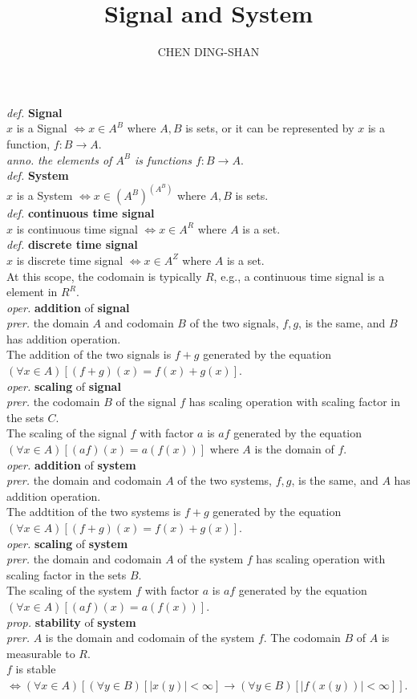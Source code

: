 \documentclass{article}
\title{Signal and System}
\author{CHEN DING-SHAN}
\date{}
\newcommand{\sd}[1]{{\left(#1\right)}}
\newcommand{\df}[1]{\emph{def.} \textbf{#1}}
\newcommand{\anno}[1]{\emph{anno.} \emph{#1}}
\newcommand{\md}[1]{{\left[#1\right]}}
\newcommand{\prer}[1]{\emph{prer.} #1}
\newcommand{\oper}[2]{\emph{oper.} \textbf{#1} of \textbf{#2}}
\newcommand{\prop}[2]{\emph{prop.} \textbf{#1} of \textbf{#2}}
\newcommand{\abs}[1]{{\left|#1\right|}}
\begin{document}
\maketitle
\noindent
\df{Signal}\\
$x$ is a Signal $\iff x \in A^B$ where $A, B$ is sets, or it can be represented by $x$ is a function, $f:B \to A$.\\
\anno{the elements of $A^B$ is functions $f:B \to A$}.\\
\df{System}\\
$x$ is a System $\iff x \in \sd{A^B}^\sd{A^B}$ where $A, B$ is sets.\\
\df{continuous time signal}\\
$x$ is continuous time signal $\iff x \in A^R$ where $A$ is a set.\\
\df{discrete time signal}\\
$x$ is discrete time signal $\iff x \in A^Z$ where $A$ is a set.\\
At this scope, the codomain is typically $R$, e.g., a continuous time signal is a element in $R^R$.\\
\oper{addition}{signal}\\
\prer{the domain $A$ and codomain $B$ of the two signals, $f,g$, is the same, and $B$ has addition operation.}\\
The addition of the two signals is $f+g$ generated by the equation $\sd{\forall x \in A}\md{\sd{f+g}\sd{x} = f\sd{x} + g\sd{x}}$.\\
\oper{scaling}{signal}\\
\prer{the codomain $B$ of the signal $f$ has scaling operation with scaling factor in the sets $C$.}\\
The scaling of the signal $f$ with factor $a$ is $af$ generated by the equation $\sd{\forall x \in A}\md{\sd{af}\sd{x} = a\sd{f\sd{x}}}$ where $A$ is the domain of $f$.\\
\oper{addition}{system}\\
\prer{the domain and codomain $A$ of the two systems, $f,g$, is the same, and $A$ has addition operation.}\\
The addtition of the two systems is $f+g$ generated by the equation $\sd{\forall x \in A}\md{\sd{f+g}\sd{x} = f\sd{x} + g\sd{x}}$.\\
\oper{scaling}{system}\\
\prer{the domain and codomain $A$ of the system $f$ has scaling operation with scaling factor in the sets $B$.}\\
The scaling of the system $f$ with factor $a$ is $af$ generated by the equation $\sd{\forall x \in A}\md{\sd{af}\sd{x} = a\sd{f\sd{x}}}$.\\
\prop{stability}{system}\\
\prer{$A$ is the domain and codomain of the system $f$. The codomain $B$ of $A$ is measurable to $R$.}\\
$f$ is stable $\iff \sd{\forall x \in A}\md{\sd{\forall y \in B}\md{\abs{x\sd{y}} < \infty} \to \sd{\forall y \in B}\md{\abs{f\sd{x\sd{y}}} < \infty}}$.\\
\end{document}
